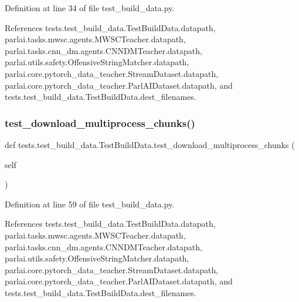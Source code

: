 Definition at line 34 of file test\+\_\+build\+\_\+data.\+py.



References tests.\+test\+\_\+build\+\_\+data.\+Test\+Build\+Data.\+datapath, parlai.\+tasks.\+mwsc.\+agents.\+M\+W\+S\+C\+Teacher.\+datapath, parlai.\+tasks.\+cnn\+\_\+dm.\+agents.\+C\+N\+N\+D\+M\+Teacher.\+datapath, parlai.\+utils.\+safety.\+Offensive\+String\+Matcher.\+datapath, parlai.\+core.\+pytorch\+\_\+data\+\_\+teacher.\+Stream\+Dataset.\+datapath, parlai.\+core.\+pytorch\+\_\+data\+\_\+teacher.\+Parl\+A\+I\+Dataset.\+datapath, and tests.\+test\+\_\+build\+\_\+data.\+Test\+Build\+Data.\+dest\+\_\+filenames.

\mbox{\label{classtests_1_1test__build__data_1_1TestBuildData_a57a7d34acf8cec7b757605c5659b6e96}} 
\subsubsection{\texorpdfstring{test\+\_\+download\+\_\+multiprocess\+\_\+chunks()}{test\_download\_multiprocess\_chunks()}}
{\footnotesize\ttfamily def tests.\+test\+\_\+build\+\_\+data.\+Test\+Build\+Data.\+test\+\_\+download\+\_\+multiprocess\+\_\+chunks (\begin{DoxyParamCaption}\item[{}]{self }\end{DoxyParamCaption})}



Definition at line 59 of file test\+\_\+build\+\_\+data.\+py.



References tests.\+test\+\_\+build\+\_\+data.\+Test\+Build\+Data.\+datapath, parlai.\+tasks.\+mwsc.\+agents.\+M\+W\+S\+C\+Teacher.\+datapath, parlai.\+tasks.\+cnn\+\_\+dm.\+agents.\+C\+N\+N\+D\+M\+Teacher.\+datapath, parlai.\+utils.\+safety.\+Offensive\+String\+Matcher.\+datapath, parlai.\+core.\+pytorch\+\_\+data\+\_\+teacher.\+Stream\+Dataset.\+datapath, parlai.\+core.\+pytorch\+\_\+data\+\_\+teacher.\+Parl\+A\+I\+Dataset.\+datapath, and tests.\+test\+\_\+build\+\_\+data.\+Test\+Build\+Data.\+dest\+\_\+filenames.



